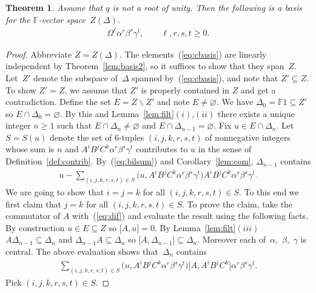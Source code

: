 \documentclass[pdftex]{sigma}
\numberwithin{equation}{section}
\newtheorem{Theorem}{Theorem}[section]
\begin{document}
\begin{Theorem}
\label{thm:centerbasis}
Assume that $q$ is not a root of unity. Then the following is a basis for
the $\mathbb F$-vector space~$Z(\Delta)$.
\begin{gather}
\Omega^\ell \alpha^r \beta^s\gamma^t, \qquad  \ell,r,s,t \geq 0.
\label{eq:cbasis}
\end{gather}
\end{Theorem}

\begin{proof}
Abbreviate $Z=Z(\Delta)$.
The elements~(\ref{eq:cbasis})
are linearly independent by
Theorem~\ref{lem:basis2},
so it suf\/f\/ices to
show that they span~$Z$.
Let~$Z'$ denote the subspace of~$\Delta$ spanned by~(\ref{eq:cbasis}), and note that
$Z' \subseteq Z$. To show
$Z'= Z$, we assume that $Z'$ is properly contained in
$Z$ and get a contradiction.
Def\/ine the set $E=Z\backslash Z'$
and note $E\not=\varnothing$.
We have
$\Delta_0=\mathbb F 1
\subseteq Z'$ so
$E \cap \Delta_0 =\varnothing$.
By this and
Lemma~\ref{lem:filt}$(i)$,$(ii)$ there exists a unique integer
$n\geq 1$ such that
$E\cap \Delta_n \not=\varnothing$ and
$E\cap \Delta_{n-1} =\varnothing$.
Fix $u \in E\cap \Delta_n$.
Let
$S=S(u)$ denote
the set of 6-tuples $(i,j,k,r,s,t)$ of nonnegative integers
whose sum is $n$ and
 $A^iB^jC^k\alpha^r\beta^s\gamma^t$
contributes to $u$ in
the sense of
Def\/inition~\ref{def:contrib}.
By~(\ref{eq:bilsum}) and Corollary~\ref{lem:com},
$\Delta_{n-1}$ contains
\begin{gather}
\label{eq:dif}
u- \sum_{(i,j,k,r,s,t) \in S}
\big( u,
A^iB^jC^k\alpha^r \beta^s \gamma^t \big)
A^iB^jC^k\alpha^r \beta^s \gamma^t.
\end{gather}
We are going to show that
$i=j=k$ for all
$(i,j,k,r,s,t) \in S$.
To this end
we f\/irst claim that $j=k$ for all
$(i,j,k,r,s,t) \in S$.
To prove the claim,
take the commutator of $A$ with~(\ref{eq:dif}) and evaluate the
result using the following facts.
By construction $u \in E \subseteq Z$
so
  $\lbrack A,u\rbrack=0$.
By Lemma~\ref{lem:filt}$(iii)$
$A\Delta_{n-1} \subseteq  \Delta_n $
and
$\Delta_{n-1}A \subseteq \Delta_n$
so
 $\lbrack A,\Delta_{n-1}\rbrack \subseteq \Delta_n$.
Moreover
 each of~$\alpha$,~$\beta$,~$\gamma$
 is central.
The above evaluation shows that~$\Delta_n$ contains
\begin{gather*}
\sum_{(i,j,k,r,s,t) \in S}
\big( u, A^iB^jC^k
\alpha^r \beta^s \gamma^t \big)
\big\lbrack A, A^iB^jC^k \big\rbrack
\alpha^r \beta^s \gamma^t.
\end{gather*}
Pick
$(i,j,k,r,s,t) \in S$.

\end{proof}
\end{document}
